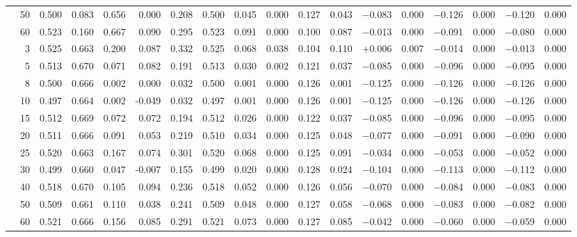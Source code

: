 \documentclass[conference]{IEEEtran}
\theoremstyle{remark}
\begin{document}
\begin{table}[ht]
{\begin{tabular}{p{2.2cm}r rrrr rr rr rr rr rr rr}
  & 50 & 0.500 & 0.083 & 0.656 & 0.000 & 0.208 & 0.500 & 0.045 & 0.000 & 0.127 & 0.043 & $-$0.083 & 0.000 & $-$0.126 & 0.000 & $-$0.120 & 0.000 \\
  & 60 & 0.523 & 0.160 & 0.667 & 0.090 & 0.295 & 0.523 & 0.091 & 0.000 & 0.100 & 0.087 & $-$0.013 & 0.000 & $-$0.091 & 0.000 & $-$0.080 & 0.000 \\
\midrule
{}
  & 3  & 0.525 & 0.663 & 0.200 & 0.087 & 0.332 & 0.525 & 0.068 & 0.038 & 0.104 & 0.110 & $+$0.006 & 0.007 & $-$0.014 & 0.000 & $-$0.013 & 0.000 \\
  & 5  & 0.513 & 0.670 & 0.071 & 0.082 & 0.191 & 0.513 & 0.030 & 0.002 & 0.121 & 0.037 & $-$0.085 & 0.000 & $-$0.096 & 0.000 & $-$0.095 & 0.000 \\
  & 8  & 0.500 & 0.666 & 0.002 & 0.000 & 0.032 & 0.500 & 0.001 & 0.000 & 0.126 & 0.001 & $-$0.125 & 0.000 & $-$0.126 & 0.000 & $-$0.126 & 0.000 \\
  & 10 & 0.497 & 0.664 & 0.002 & -0.049 & 0.032 & 0.497 & 0.001 & 0.000 & 0.126 & 0.001 & $-$0.125 & 0.000 & $-$0.126 & 0.000 & $-$0.126 & 0.000 \\
  & 15 & 0.512 & 0.669 & 0.072 & 0.072 & 0.194 & 0.512 & 0.026 & 0.000 & 0.122 & 0.037 & $-$0.085 & 0.000 & $-$0.096 & 0.000 & $-$0.095 & 0.000 \\
  & 20 & 0.511 & 0.666 & 0.091 & 0.053 & 0.219 & 0.510 & 0.034 & 0.000 & 0.125 & 0.048 & $-$0.077 & 0.000 & $-$0.091 & 0.000 & $-$0.090 & 0.000 \\
  & 25 & 0.520 & 0.663 & 0.167 & 0.074 & 0.301 & 0.520 & 0.068 & 0.000 & 0.125 & 0.091 & $-$0.034 & 0.000 & $-$0.053 & 0.000 & $-$0.052 & 0.000 \\
  & 30 & 0.499 & 0.660 & 0.047 & -0.007 & 0.155 & 0.499 & 0.020 & 0.000 & 0.128 & 0.024 & $-$0.104 & 0.000 & $-$0.113 & 0.000 & $-$0.112 & 0.000 \\
  & 40 & 0.518 & 0.670 & 0.105 & 0.094 & 0.236 & 0.518 & 0.052 & 0.000 & 0.126 & 0.056 & $-$0.070 & 0.000 & $-$0.084 & 0.000 & $-$0.083 & 0.000 \\
  & 50 & 0.509 & 0.661 & 0.110 & 0.038 & 0.241 & 0.509 & 0.048 & 0.000 & 0.127 & 0.058 & $-$0.068 & 0.000 & $-$0.083 & 0.000 & $-$0.082 & 0.000 \\
  & 60 & 0.521 & 0.666 & 0.156 & 0.085 & 0.291 & 0.521 & 0.073 & 0.000 & 0.127 & 0.085 & $-$0.042 & 0.000 & $-$0.060 & 0.000 & $-$0.059 & 0.000 \\

\end{tabular}}
\end{table}
\end{document}
